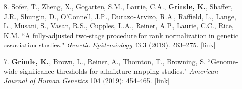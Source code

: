 \documentclass[margin]{res}
\begin{document}
\begin{resume}
\begin{itemize}
\item[8.] Sofer, T., Zheng, X., Gogarten, S.M., Laurie, C.A., \textbf{Grinde, K.}, Shaffer, J.R., Shungin, D., O'Connell, J.R., Durazo-Arvizo, R.A., Raffield, L., Lange, L., Musani, S., Vasan, R.S., Cupples, L.A., Reiner, A.P., Laurie, C.C., Rice, K.M. ``A fully-adjusted two-stage procedure for rank normalization in genetic association studies." \textit{Genetic Epidemiology} 43.3 (2019): 263--275.
\href{https://onlinelibrary.wiley.com/doi/abs/10.1002/gepi.22188}{[link]}

\item[7.] \textbf{Grinde, K.}, Brown, L., Reiner, A., Thornton, T., Browning, S. ``Genome-wide significance thresholds for admixture mapping studies." \textit{American Journal of Human Genetics} 104 (2019): 454--465. 
\href{https://www.cell.com/ajhg/pdf/S0002-9297(19)30008-4.pdf}{[link]}


\end{itemize}
\end{resume}
\end{document}
